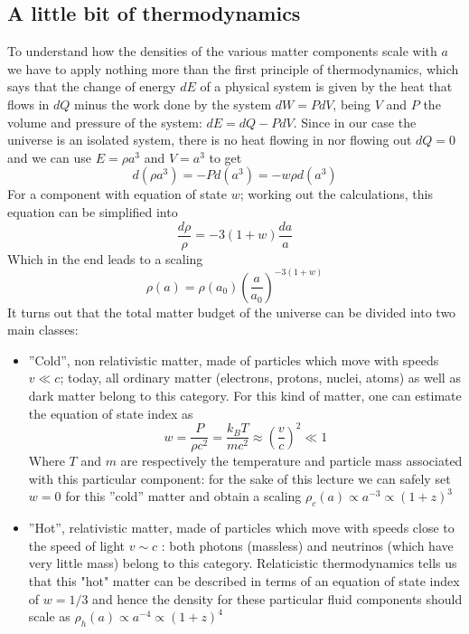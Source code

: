 \documentclass[11pt, a4paper,oneside,openright]{book}
\numberwithin{equation}{section}
\begin{document}
\subsection{A little bit of thermodynamics}
To understand how the densities of the various matter components scale with $a$ we have to apply nothing more than the first principle of thermodynamics, which says that the change of energy $dE$ of a physical system is given by the heat that flows in $dQ$ minus the work done by the system $dW=PdV$, being $V$ and $P$ the volume and pressure of the system: $dE=dQ-PdV$. Since in our case the universe is an isolated system, there is no heat flowing in nor flowing out $dQ=0$ and we can use $E=\rho a^3$ and $V=a^3$ to get
\begin{equation}
d(\rho a^3)=-Pd(a^3)=-w\rho d(a^3)
\end{equation}
For a component with equation of state $w$; working out the calculations, this equation can be simplified into 
\begin{equation}
\frac{d\rho}{\rho}=-3(1+w)\frac{da}{a}
\end{equation}
Which in the end leads to a scaling 
\begin{equation}
\rho(a)=\rho(a_0)\left(\frac{a}{a_0}\right)^{-3(1+w)}
\end{equation}
It turns out that the total matter budget of the universe can be divided into two main classes:
\begin{itemize}
\item ''Cold'', non relativistic matter, made of particles which move with speeds $v\ll c$; today, all ordinary matter (electrons, protons, nuclei, atoms) as well as dark matter belong to this category. For this kind of matter, one can estimate the equation of state index as 
\begin{equation}
w=\frac{P}{\rho c^2}=\frac{k_B T}{mc^2}\approx \left(\frac{v}{c}\right)^2\ll 1
\end{equation}
Where $T$ and $m$ are respectively the temperature and particle mass associated with this particular component: for the sake of this lecture we can safely set $w=0$ for this ''cold'' matter and obtain a scaling $\rho_c(a)\propto a^{-3}\propto (1+z)^3$
\item ''Hot'', relativistic matter, made of particles which move with speeds close to the speed of light $v\sim c $ : both photons (massless) and neutrinos (which have very little mass) belong to this category. Relaticistic thermodynamics tells us that this "hot" matter can be described in terms of an equation of state index of $w=1/3$ and hence the density for these particular fluid components should scale as $\rho_h(a)\propto a^{-4}\propto (1+z)^4$
\end{itemize}
\end{document}
